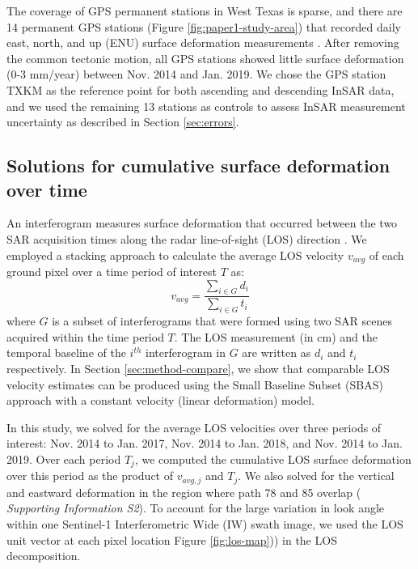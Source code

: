 \documentclass{utexasthesis}
\begin{document}
The coverage of GPS permanent stations in West Texas is sparse, and there are 14 permanent GPS stations (Figure \ref{fig:paper1-study-area}) that recorded daily east, north, and up (ENU) surface deformation measurements \citep{Blewitt2018HarnessingGpsData}. After removing the common tectonic motion, all GPS stations showed little surface deformation (0-3 mm/year) between Nov. 2014 and Jan. 2019. We chose the GPS station TXKM as the reference point for both ascending and descending InSAR data, and we used the remaining 13 stations as controls to assess InSAR measurement uncertainty as described in Section \ref{sec:errors}.

\subsection{Solutions for cumulative surface deformation over time}
\label{sec:stacking}
An interferogram measures surface deformation that occurred between the two SAR acquisition times along the radar line-of-sight (LOS) direction \citep{Hanssen2001RadarInterferometryData}. We employed a stacking approach \citep{Sandwell1998PhaseGradientApproach} to calculate the average LOS velocity $v_{avg}$ of each ground pixel over a time period of interest $T$ as:
\begin{equation}
	v_{avg} = \frac{\sum_{i \in G} d_i}{\sum_{i \in G} t_i}
	\label{eq:stacking}
\end{equation}
where $G$ is a subset of interferograms that were formed using two SAR scenes acquired within the time period $T$. The LOS measurement (in cm) and the temporal baseline of the $i^{th}$ interferogram in $G$ are written as $d_i$ and $ t_i $ respectively. In Section \ref{sec:method-compare}, we show that comparable LOS velocity estimates can be produced using the Small Baseline Subset (SBAS) approach \citep{Berardino2002NewAlgorithmSurface} with a constant velocity (linear deformation) model.

In this study, we solved for the average LOS velocities over three periods of interest: Nov. 2014 to Jan. 2017, Nov. 2014 to Jan. 2018, and Nov. 2014 to Jan. 2019. Over each period $T_j$, we computed the cumulative LOS surface deformation over this period as the product of $v_{avg,j}$ and $T_j$. We also solved for the vertical and eastward deformation in the region where path 78 and 85 overlap ( \textit{Supporting Information S2}). To account for the large variation in look angle within one Sentinel-1 Interferometric Wide (IW) swath image, we used the LOS unit vector at each pixel location Figure \ref{fig:los-map})) in the LOS decomposition.
\end{document}
